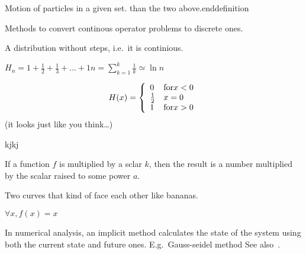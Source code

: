 \begin{definition}[Flow]
    Motion of particles in a given set.
\Better than the two above.end{definition}

\begin{definition}
    Methods to convert continous operator problems to discrete ones.
\end{definition}

\begin{definition}
   A distribution without steps, i.e.\ it is continious. 
\end{definition}

\begin{definition}
    $H_{n} = 1 + \frac{1}{2} + \frac{1}{3} + \dots + {1}{n} =
    {\sum\limits_{k = 1}^{k}} \frac{1}{k} \simeq \ln n$
\end{definition}

\begin{definition}
    $$
    H(x) = \left\{
            \begin{array}{l l}
                0 & \text{for} x < 0 \\
                \frac{1}{2} & x = 0 \\
                1 & \text{for} x > 0 \\
            \end{array}
        \right.
    $$
    (it looks just like you think\dots)
\end{definition}

\begin{definition}
    kjkj
\end{definition}

\begin{definition}[Homogenous]
    If a function $f$ is multiplied by a sclar $k$, then the result
    is a number multiplied by the scalar raised to some power $a$.
\end{definition}

\begin{definition}[Hyperbolic]
    Two curves that kind of face each other like bananas.
\end{definition}

\begin{definition}
    $\forall{x}, f(x) = x$
\end{definition}

\begin{definition}\label{implicitmethod}
    In numerical analysis, an implicit method calculates the state of the system
    using both the current state and future ones. E.g.\ Gauss-seidel method
    See also~.
\end{definition}


\end{definition}
